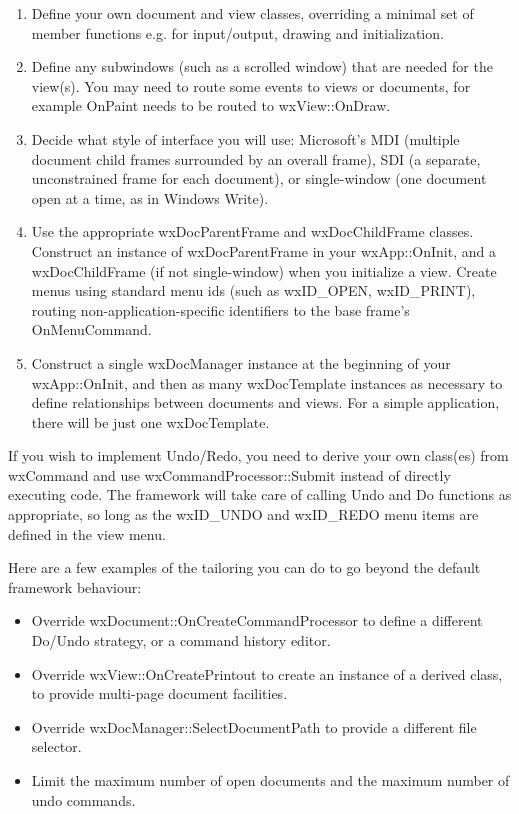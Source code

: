 \begin{enumerate}\itemsep=0pt
\item Define your own document and view classes, overriding a minimal set of
member functions e.g. for input/output, drawing and initialization.
\item Define any subwindows
(such as a scrolled window) that are needed for the view(s). You may need to route some events
to views or documents, for example OnPaint needs to be routed to wxView::OnDraw.
\item Decide what style of interface you will use: Microsoft's MDI (multiple
document child frames surrounded by an overall frame), SDI (a separate, unconstrained frame
for each document), or single-window (one document open at a time, as in Windows Write).
\item Use the appropriate wxDocParentFrame and wxDocChildFrame classes. Construct an instance
of wxDocParentFrame in your wxApp::OnInit, and a wxDocChildFrame (if not single-window) when
you initialize a view. Create menus using standard menu ids (such as wxID\_OPEN, wxID\_PRINT),
routing non-application-specific identifiers to the base frame's OnMenuCommand.
\item Construct a single wxDocManager instance at the beginning of your wxApp::OnInit, and then
as many wxDocTemplate instances as necessary to define relationships between documents and
views. For a simple application, there will be just one wxDocTemplate.
\end{enumerate}

If you wish to implement Undo/Redo, you need to derive your own class(es) from wxCommand
and use wxCommandProcessor::Submit instead of directly executing code. The framework will
take care of calling Undo and Do functions as appropriate, so long as the wxID\_UNDO and
wxID\_REDO menu items are defined in the view menu.

Here are a few examples of the tailoring you can do to go beyond the default framework
behaviour:

\begin{itemize}\itemsep=0pt
\item Override wxDocument::OnCreateCommandProcessor to define a different Do/Undo strategy,
or a command history editor.
\item Override wxView::OnCreatePrintout to create an instance of a derived \rtfsp
class, to provide multi-page document facilities.
\item Override wxDocManager::SelectDocumentPath to provide a different file selector.
\item Limit the maximum number of open documents and the maximum number of undo commands.
\end{itemize}

